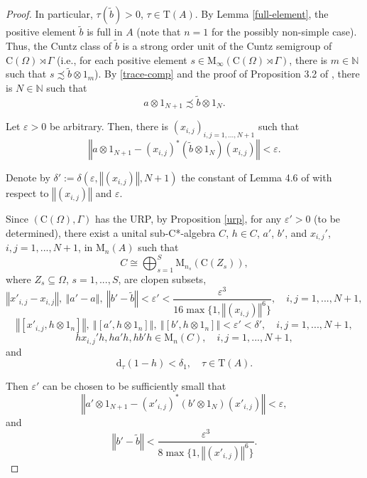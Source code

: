 \documentclass[12pt, oneside, psamsfonts]{amsart}
\theoremstyle{definition}
\theoremstyle{remark}
\numberwithin{equation}{section}
\newcommand{\norm}[1]{\left\Vert#1\right\Vert}
\newcommand{\eps}{\varepsilon}
\newcommand{\tr}{\mathrm{T}}
\begin{document}
\begin{proof}
In particular, $\tau(\tilde{b}) >0$, $\tau \in \tr(A)$. By Lemma \ref{full-element}, the positive element $\tilde{b}$ is full in $A$ (note that $n=1$ for the possibly non-simple case). Thus, the Cuntz class of $\tilde{b}$ is a strong order unit of the Cuntz semigroup of $\mathrm{C}(\Omega) \rtimes \Gamma$ (i.e., for each positive element $s \in \mathrm{M}_\infty(\mathrm{C}(\Omega) \rtimes \Gamma)$, there is $m \in \mathbb N$ such that $s \precsim \tilde{b}\otimes 1_m$). By \eqref{trace-comp} and the proof of Proposition 3.2 of \cite{RorUHF2}, there is $N \in \mathbb N$ such that
\begin{equation}\label{mult-comp}
  a \otimes 1_{N+1} \precsim  \tilde{b} \otimes 1_N. 
\end{equation}

Let $\eps>0$ be arbitrary. Then, there is $(x_{i, j})_{i, j=1,..., N+1}$ such that
\begin{equation}\label{close-relation}
\norm{a \otimes 1_{N+1} - (x_{i, j})^*(\tilde{b} \otimes 1_N)(x_{i, j})} < \eps.
\end{equation}

Denote by $\delta' := \delta(\eps, \norm{(x_{i, j})}, N+1)$ the constant of Lemma 4.6 of \cite{Niu-MD-Z} with respect to $\norm{(x_{i, j})}$ and $\eps$.

Since $(\mathrm{C}(\Omega), \Gamma)$ has the URP, by Proposition \ref{urp}, for any $\eps'>0$ (to be determined), there exist a unital sub-C*-algebra $C$, $h \in C$, $a'$, $b'$, and $x_{i, j}'$, $i, j =1, ..., N+1$, in $\mathrm{M}_n(A)$ such that
$$C \cong \bigoplus_{s=1}^S \mathrm{M}_{n_s}(\mathrm{C}(Z_s)),$$ where $Z_s \subseteq \Omega$, $s=1, ..., S$, are clopen subsets, 
$$ \norm{x'_{i, j} - x_{i, j}},\  \norm{a' - a},\  \norm{b' - \tilde{b}} < \eps' < \frac{\eps^3}{16 \max\{1, \norm{(x_{i, j})}^6\}}, \quad i, j = 1, ..., N+1,$$
\begin{equation}\label{almost-comm-0} 
\norm{[x'_{i, j}, h\otimes 1_n]},\  \norm{[a', h\otimes 1_n]},\  \norm{[b', h\otimes 1_n]} < \eps' < \delta', \quad i, j = 1, ..., N+1,
\end{equation}
\begin{equation}\label{in-C-01} 
hx_{i, j}'h, ha'h, hb'h \in \mathrm{M}_n(C),\quad i, j=1, ..., N+1, 
\end{equation}
and
$$\mathrm{d}_\tau(1 - h) < \delta_1,\quad \tau \in \tr(A).$$



Then $\eps'$ can be chosen to be sufficiently small that
\begin{equation}\label{appro-equ-1}
\norm{a' \otimes 1_{N+1}  - (x'_{i, j})^* (b' \otimes 1_N) (x'_{i, j})} < \eps,
\end{equation}
and
\begin{equation}\label{appro-equ-2}
\norm{b' - \tilde{b}} < \frac{\eps^3}{8 \max\{1, \norm{(x'_{i, j})}^6\}}.
\end{equation}


\end{proof}
\end{document}
